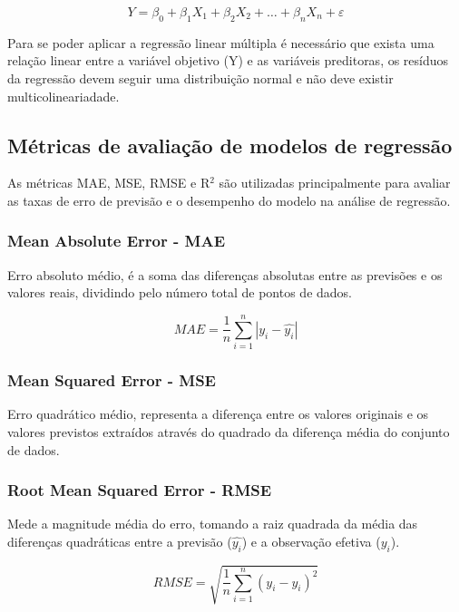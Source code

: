 \documentclass[conference]{IEEEtran}
\begin{document}
\begin{equation}
	Y = \beta_0 + \beta_1 X_1 + \beta_2 X_2 + \dots + \beta_n X_n + \varepsilon
\end{equation}

Para se poder aplicar a regressão linear múltipla é necessário que exista uma relação linear entre a variável objetivo (Y) e as variáveis preditoras, os resíduos da regressão devem seguir uma distribuição normal e não deve existir multicolineariadade.\cite{madureira2024aed}

\subsection{Métricas de avaliação de modelos de regressão}

As métricas MAE, MSE, RMSE e R$^2$ são utilizadas principalmente para avaliar as taxas de erro de previsão e o desempenho do modelo na análise de regressão.

\medskip
\subsubsection{Mean Absolute Error - MAE}
Erro absoluto médio, é a soma das diferenças absolutas entre as previsões e os valores reais, dividindo pelo número total de pontos de dados.


\begin{equation}
	MAE = \frac{1}{n} {\sum_{i=1}^{n} |y_i - \hat{y_i}|}
	 \label{MAEeq}
\end{equation}

\medskip
\subsubsection{Mean Squared Error - MSE}
Erro quadrático médio, representa a diferença entre os valores originais e os valores previstos extraídos através do quadrado da diferença média do conjunto de dados.

\medskip
\subsubsection{Root Mean Squared Error - RMSE}
Mede a magnitude média do erro, tomando a raiz quadrada da média das diferenças quadráticas entre a previsão ($\hat{y_i}$) e a observação efetiva ($y_i$).


\begin{equation}
	RMSE = \sqrt{\frac{1}{n} {\sum_{i=1}^{n} (y_i - \hat{y_i})^2}}
	\label{RMSEeq}
\end{equation}
\end{document}
